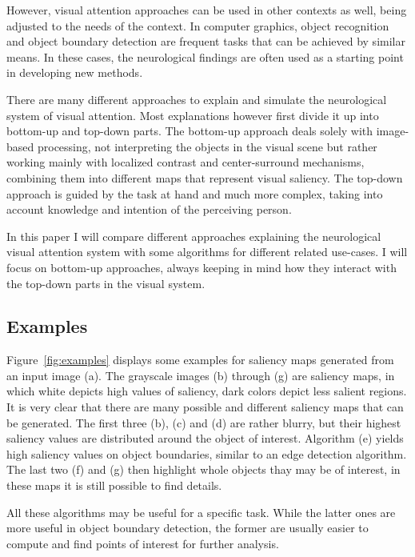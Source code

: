 \documentclass[a4paper,12pt,fleqn,oneside]{scrartcl}
\begin{document}
However, visual attention approaches can be used in other contexts as well, being adjusted to the  needs of the context.
In computer graphics, object recognition and object boundary detection are frequent tasks that can be achieved by
similar means. In these cases, the neurological findings are often used as a starting point in developing new methods.

There are many different approaches to explain and simulate the neurological  system of visual attention. Most
explanations however first divide it up into bottom-up and top-down parts. The bottom-up approach deals solely with
image-based processing, not interpreting the objects in the visual scene but rather working mainly with localized
contrast and center-surround mechanisms, combining them into different maps that represent visual saliency. The top-down
approach is guided by the task at hand and much more complex, taking into account knowledge and intention of the
perceiving person.

In this paper I will compare different approaches explaining the neurological visual  attention system with some
algorithms for different related use-cases. I will focus on bottom-up approaches, always keeping in mind how they
interact with the top-down parts in the visual system.

\subsection{Examples}

Figure~\ref{fig:examples} displays some examples for saliency maps generated from an input image (a). The grayscale
images (b) through (g) are saliency maps, in which white depicts high values of saliency, dark colors depict less
salient regions. It is very clear that there are many possible and different saliency maps that can be generated. The
first three (b), (c) and (d) are rather blurry, but their highest saliency values are distributed around the object of
interest. Algorithm (e) yields high saliency values on object boundaries, similar to an edge detection algorithm. The
last two (f) and (g) then highlight whole objects thay may be of interest, in these maps  it is still possible to find
details.

All these algorithms may be useful for a specific task. While the latter ones are more useful in object boundary
detection, the former are usually easier to compute and find points of interest for further analysis.
\end{document}
